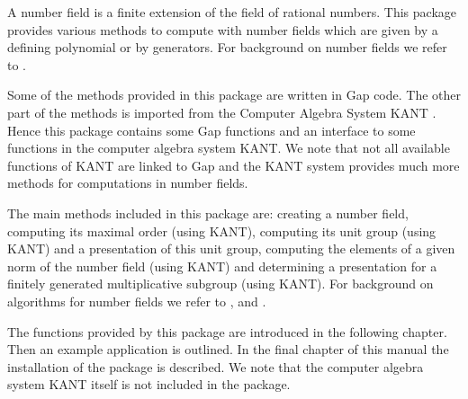 

A number field is a finite extension of the field of rational numbers. 
This package provides various methods to compute with number fields
which are given by a defining polynomial or by generators. For background 
on number fields we refer to \cite{Sta79}.

Some of the methods provided in this package are written in Gap code.
The other part of the methods is imported from the Computer Algebra 
System KANT \cite{Kant}. Hence this package contains some Gap functions 
and an interface to some functions in the computer algebra system KANT.
We note that not all available functions of KANT are linked to Gap and
the KANT system provides much more methods for computations in number
fields. 

The main methods included in this package are: creating a number field, 
computing its maximal order (using KANT), computing its unit group (using 
KANT) and a presentation of this unit group, computing the elements of a
given norm of the number field (using KANT) and determining a presentation
for a finitely generated multiplicative subgroup (using KANT). For background
on algorithms for number fields we refer to \cite{Poh93}, \cite{PZa89} and
\cite{Coh93}.

The functions provided by this package are introduced in the following
chapter. Then an example application is outlined. In the final chapter
of this manual the installation of the package is described. We note
that the computer algebra system KANT itself is not included in the package. 

